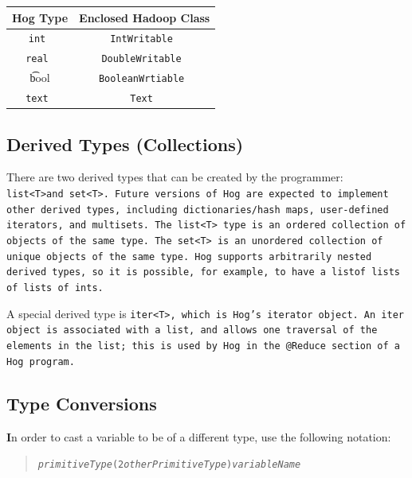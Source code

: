 \documentclass{report}
\begin{document}
\begin{center}
\begin{tabular}{|c|c|}
    \hline
\textbf{Hog Type} & \textbf{Enclosed Hadoop Class} \\ \hline
\tt int & \tt IntWritable \\ \hline
\tt real & \tt DoubleWritable \\ \hline
\t bool & \tt BooleanWrtiable \\ \hline
\tt text & \tt Text \rm \\ \hline
\end{tabular}
\end{center}


\subsection{Derived Types (Collections)} %
\label{sub:derived_types_collections_}

There are two derived types that can be created by the programmer: \tt
list<T>\rm and \tt set<T>\rm.  Future versions of Hog are expected to implement
other derived types, including dictionaries/hash maps, user-defined iterators,
and multisets. The \tt list<T> \rm type is an ordered collection of objects of
the same type. The \tt set<T> \rm is an unordered collection of unique objects
of the same type. Hog supports arbitrarily nested derived types, so it is
possible, for example, to have a \tt list\rm  of \tt list\rm s of \tt list\rm s
of \tt int\rm s.

A special derived type is \tt iter<T>\rm, which is Hog's iterator object. An
\tt iter \rm object is associated with a list, and allows one traversal of the
elements in the list; this is used by Hog in the \tt @Reduce \rm section of a
Hog program.


\subsection{Type Conversions} %
\label{sub:conversions}

\textbf In order to cast a variable to be of a different type, use the
following notation:

\begin{quotation}
      \tt \emph{primitiveType}(2\emph{otherPrimitiveType})\rm \emph{variableName}
\end{quotation}
\end{document}
